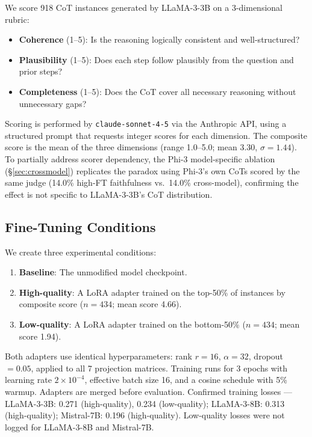 \documentclass[11pt]{article}
\begin{document}
We score 918 CoT instances generated by LLaMA-3-3B on a
3-dimensional rubric:
\begin{itemize}
  \item \textbf{Coherence} (1--5): Is the reasoning logically consistent and
        well-structured?
  \item \textbf{Plausibility} (1--5): Does each step follow plausibly from
        the question and prior steps?
  \item \textbf{Completeness} (1--5): Does the CoT cover all necessary
        reasoning without unnecessary gaps?
\end{itemize}
Scoring is performed by \texttt{claude-sonnet-4-5} via the Anthropic API,
using a structured prompt that requests integer scores for each dimension.
The composite score is the mean of the three dimensions (range 1.0--5.0;
mean 3.30, $\sigma = 1.44$).
To partially address scorer dependency, the Phi-3 model-specific ablation
(\S\ref{sec:crossmodel}) replicates the paradox using Phi-3's own CoTs scored
by the same judge (14.0\% high-FT faithfulness vs.\ 14.0\% cross-model),
confirming the effect is not specific to LLaMA-3-3B's CoT distribution.

\subsection{Fine-Tuning Conditions}

We create three experimental conditions:
\begin{enumerate}
  \item \textbf{Baseline}: The unmodified model checkpoint.
  \item \textbf{High-quality}: A LoRA adapter \citep{hu2022lora} trained on
        the top-50\% of instances by composite score ($n = 434$;
        mean score 4.66).
  \item \textbf{Low-quality}: A LoRA adapter trained on the bottom-50\%
        ($n = 434$; mean score 1.94).
\end{enumerate}
Both adapters use identical hyperparameters: rank $r = 16$, $\alpha = 32$,
dropout $= 0.05$, applied to all 7 projection matrices. Training runs for 3
epochs with learning rate $2 \times 10^{-4}$, effective batch size 16, and a
cosine schedule with 5\% warmup. Adapters are merged before evaluation.
Confirmed training losses --- LLaMA-3-3B: 0.271 (high-quality), 0.234
(low-quality); LLaMA-3-8B: 0.313 (high-quality); Mistral-7B: 0.196
(high-quality). Low-quality losses were not logged for LLaMA-3-8B and Mistral-7B.
\end{document}
